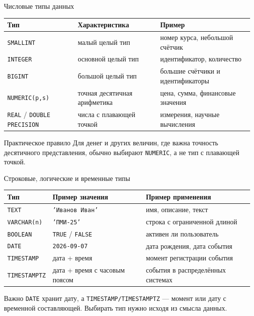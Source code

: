 \documentclass[aspectratio=169]{beamer}
\begin{document}
\begin{frame}{Числовые типы данных}
\small
\begin{table}
\centering
\begin{tabular}{p{}|p{}|p{}}
\toprule
\textbf{Тип} & \textbf{Характеристика} & \textbf{Пример}\\
\midrule
\texttt{SMALLINT} & малый целый тип & номер курса, небольшой счётчик\\
\texttt{INTEGER} & основной целый тип & идентификатор, количество\\
\texttt{BIGINT} & большой целый тип & большие счётчики и идентификаторы\\
\texttt{NUMERIC(p,s)} & точная десятичная арифметика & цена, сумма, финансовые значения\\
\texttt{REAL} / \texttt{DOUBLE PRECISION} & числа с плавающей точкой & измерения, научные вычисления\\
\bottomrule
\end{tabular}
\end{table}

\vspace{0.25cm}
\begin{alertblock}{Практическое правило}
Для денег и других величин, где важна точность десятичного представления,
обычно выбирают \texttt{NUMERIC}, а не тип с плавающей точкой.
\end{alertblock}
\end{frame}

\begin{frame}{Строковые, логические и временные типы}
\small
\begin{table}
\centering
\begin{tabular}{p{}|p{}|p{}}
\toprule
\textbf{Тип} & \textbf{Пример значения} & \textbf{Пример применения}\\
\midrule
\texttt{TEXT} & \texttt{'Иванов Иван'} & имя, описание, текст\\
\texttt{VARCHAR(n)} & \texttt{'ПМИ-25'} & строка с ограниченной длиной\\
\texttt{BOOLEAN} & \texttt{TRUE} / \texttt{FALSE} & активен ли пользователь\\
\texttt{DATE} & \texttt{2026-09-07} & дата рождения, дата события\\
\texttt{TIMESTAMP} & дата + время & момент регистрации события\\
\texttt{TIMESTAMPTZ} & дата + время с часовым поясом & события в распределённых системах\\
\bottomrule
\end{tabular}
\end{table}

\vspace{0.25cm}
\begin{block}{Важно}
\texttt{DATE} хранит дату, а \texttt{TIMESTAMP/TIMESTAMPTZ} — момент или дату с временной составляющей.
Выбирать тип нужно исходя из смысла данных.
\end{block}
\end{frame}
\end{document}
